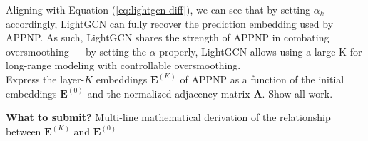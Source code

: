 \noindent Aligning with Equation (\ref{eq:lightgcn-diff}), we can see that by setting $\alpha_k$ accordingly, LightGCN can fully recover the prediction embedding used by APPNP. As such, LightGCN shares the strength of APPNP in combating oversmoothing — by setting the $\alpha$ properly, LightGCN allows using a large K for long-range modeling with controllable oversmoothing.\\

\noindent Express the layer-$K$ embeddings $\mathbf{E}^{(K)}$ of APPNP as a function of the initial embeddings $\mathbf{E}^{(0)}$ and the normalized adjacency matrix $\tilde{\mathbf{A}}$. Show all work.

 \textbf{What to submit?} Multi-line mathematical derivation of the relationship between $\mathbf{E}^{(K)}$ and $\mathbf{E}^{(0)}$

 \Solution{}